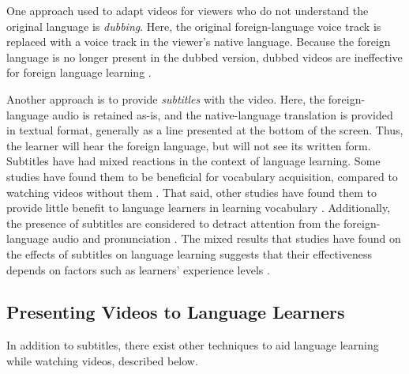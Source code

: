 \documentclass{sigchi}
\begin{document}
One approach used to adapt videos for viewers who do not understand the original language is \emph{dubbing}. Here, the original foreign-language voice track is replaced with a voice track in the viewer's native language.
Because the foreign language is no longer present in the dubbed version, dubbed videos are ineffective for foreign language learning \cite{dubbing}.

Another approach is to provide \emph{subtitles} with the video. Here, the foreign-language audio is retained as-is, and the native-language translation is provided in textual format, generally as a line presented at the bottom of the screen.
Thus, the learner will hear the foreign language, but will not see its written form.
Subtitles have had mixed reactions in the context of language learning. Some studies have found them to be beneficial for vocabulary acquisition, compared to watching videos without them \cite{danan2004captioning}.
That said, other studies have found them to provide little benefit to language learners in learning vocabulary \cite{danan1992reversed}. Additionally, the presence of subtitles are considered to detract attention from the foreign-language audio and pronunciation \cite{mitterer2009foreign}.
The mixed results that studies have found on the effects of subtitles on language learning suggests that their effectiveness depends on factors such as learners' experience levels \cite{bianchi2008captions}.

\subsection{Presenting Videos to Language Learners}


In addition to subtitles, there exist other techniques to aid language learning
while watching videos, described below.
\end{document}
